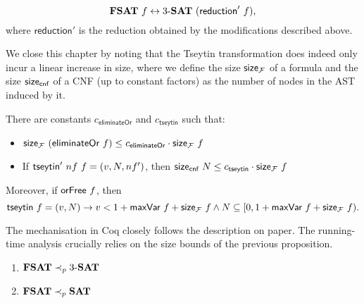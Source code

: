 \begin{lemma}
  \[\textbf{FSAT}{}~f \leftrightarrow \text{3-\textbf{SAT}{}}~(\textsf{reduction}'~f), \]
  where $\textsf{reduction}'$ is the reduction obtained by the modifications described above.
\end{lemma}

We close this chapter by noting that the Tseytin transformation does indeed only incur a linear increase in size, where we define the size $\textsf{size}_{\mathcal{F}}$ of a formula and the size $\textsf{size}_{\textsf{cnf}}$ of a CNF (up to constant factors) as the number of nodes in the AST induced by it. 

\begin{proposition}
  There are constants $c_{\textsf{eliminateOr}}$ and $c_{\textsf{tseytin}}$ such that:
  \begin{itemize}
    \item $\textsf{size}_{\mathcal{F}}~(\textsf{eliminateOr}{}~f) \le c_{\textsf{eliminateOr}} \cdot \textsf{size}_{\mathcal{F}}~f$
    \item If $\textsf{tseytin}'~nf~f = (v, N, nf')$, then $\textsf{size}_{\textsf{cnf}}~N \le c_{\textsf{tseytin}} \cdot \textsf{size}_{\mathcal{F}}~f$
  \end{itemize}
  Moreover, if $\textsf{orFree}~f$, then
  \[\textsf{tseytin}~f = (v, N) \rightarrow v < 1 +{\textsf{maxVar}~f} + \textsf{size}_{\mathcal{F}}~f \land N \subseteq [0, 1 +{\textsf{maxVar}~f} + \textsf{size}_{\mathcal{F}}~f). \]
\end{proposition}

The mechanisation in Coq closely follows the description on paper. The running-time analysis crucially relies on the size bounds of the previous proposition.
\begin{theorem}\leavevmode
  \begin{enumerate}
    \item $\textbf{FSAT}{} \prec_p{} \text{3-\textbf{SAT}{}}$
    \item $\textbf{FSAT}{} \prec_p{} \textbf{SAT}{}$
  \end{enumerate}
\end{theorem}
